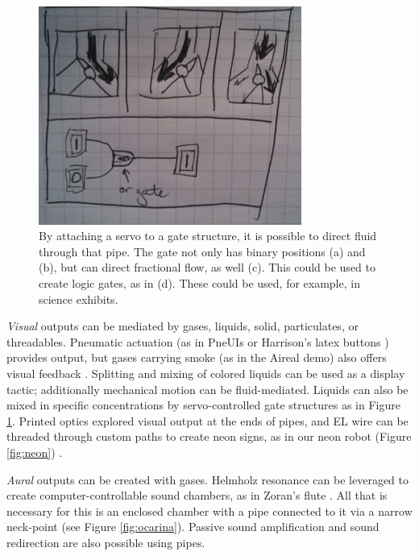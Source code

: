 \begin{figure}[h]
\centering
    \includegraphics[width=3.4in]{figures/placeholder/direct.jpg}
\caption{By attaching a servo to a gate structure, it is possible to direct fluid through that pipe.  The gate not only has binary positions (a) and (b), but can direct fractional flow, as well (c).  This could be used to create logic gates, as in (d).  These could be used, for example, in science exhibits.}
\label{fig:direct}
\end{figure}

\emph{Visual} outputs can be mediated by gases, liquids, solid, particulates, or threadables.  Pneumatic actuation (as in PneUIs \cite{Yao-pneui} or Harrison's latex buttons \cite{Harrison-buttons}) provides output, but gases carrying smoke (as in the Aireal \cite{Sodhi-aireal} demo) also offers visual feedback .  Splitting and mixing of colored liquids can be used as a display tactic; additionally mechanical motion can be fluid-mediated.  Liquids can also be mixed in specific concentrations by servo-controlled gate structures as in Figure \ref{fig:direct}.  Printed optics \cite{Willis-printedoptics} explored visual output at the ends of pipes, and  EL wire can be threaded through custom paths to create neon signs, as in our neon robot (Figure \ref{fig:neon}) .

\emph{Aural} outputs can be created with gases.  Helmholz resonance can be leveraged to create computer-controllable sound chambers, as in Zoran's flute \cite{Zoran-flute}.  All that is necessary for this is an enclosed chamber with a pipe connected to it via a narrow neck-point (see Figure \ref{fig:ocarina}).  Passive sound amplification and sound redirection are also possible using pipes.

